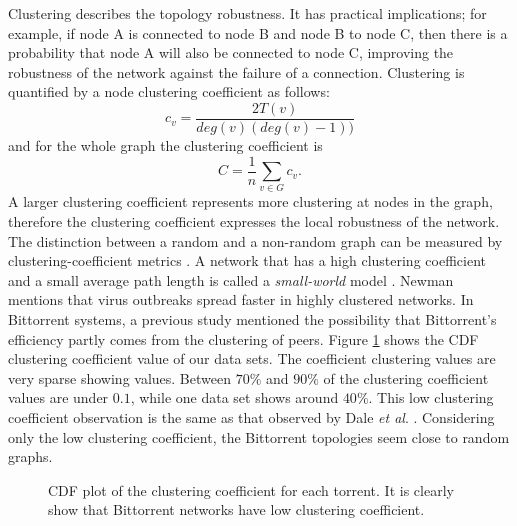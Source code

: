 \documentclass[10pt,conference,letterpaper,final]{IEEEtran}
\begin{document}
Clustering describes the topology robustness. 
It has practical implications; for example, if node A is connected to node B and node B to node C, then there is a probability that node A will also be
connected to node C, improving the robustness of the network against the failure of a connection.  
Clustering is quantified by a node clustering coefficient as follows:
\begin{equation}
c_v = \frac{2T(v)}{deg(v) (deg(v)-1))}
\end{equation} 
and for the whole graph the clustering coefficient is
\begin{equation}
C = \frac{1}{n} \sum_{v \in G} c_v.
\end{equation}
A larger clustering coefficient represents more clustering at nodes in the graph, therefore the clustering coefficient expresses the local robustness of the network.
The distinction between a random and a non-random graph can be measured by clustering-coefficient metrics \cite{watts1998collective}.
A network that has a high clustering coefficient and a small average path length is called a \textit{small-world} model \cite{watts1998collective}.
Newman \cite{newman2003properties} mentions that virus outbreaks spread faster in highly clustered networks. 
In Bittorrent systems, a previous study \cite{legout2007clustering} mentioned the possibility that Bittorrent's efficiency partly comes from the clustering of peers.
Figure \ref{fig:cdf-clustering} shows the CDF clustering coefficient value of our data sets.
The coefficient clustering values are very sparse showing values. 
Between $70\%$ and $90\%$ of the clustering coefficient values are under $0.1$, while one data set shows around $40\%$. 
This low clustering coefficient observation is the same as that observed by Dale \textit{et al}. \cite{dale2008evolution}.
Considering only the low clustering coefficient, the Bittorrent topologies seem close to random graphs.
\begin{figure}
\centering
{}
\caption{CDF plot of the clustering coefficient for each torrent. It is clearly show that Bittorrent networks have low clustering coefficient.} 
\label{fig:cdf-clustering}
\vspace{-2mm}
\end{figure}
\end{document}
